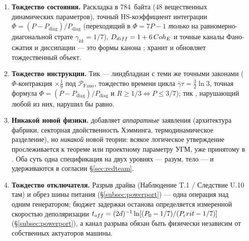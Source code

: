 \begin{enumerate}[leftmargin=1.6em,itemsep=1pt]
  \item \textbf{Тождество состояния.} Раскладка \DM{} в $784$~байта ($48$
        вещественных динамических параметров), точный HS-коэффициент интеграции
        $\Phi=(P-P_{\mathrm{diag}})/P_{\mathrm{diag}}$ (переходящий в
        $\Phi=7P-1$ \emph{только} на равномерно-диагональной страте
        $\gamma_{kk}=1/7$), $D_{diff}=1+6\,Coh_E$ и точные каналы
        Фано-сжатия и диссипации --- это формы канона \SYNARC{}; \TALOS{} хранит
        и обновляет тождественный объект.
  \item \textbf{Тождество инструкции.} Тик --- линдбладиан \SYNARC{} с теми же
        точными законами ($\Phi$-контракция $\times\tfrac19$ под
        $\mathcal{P}_{\mathrm{Fano}}$, тождество времени цикла
        $\bar\gamma\tau=\tfrac32\ln3$, точная формула
        $\Phi=(P-P_{\mathrm{diag}})/P_{\mathrm{diag}}$ и
        $R\ge 1/3\Leftrightarrow P\le 3/7$); тик \TALOS{}, нарушающий любой из
        них, нарушил бы \SYNARC{} равно.
  \item \textbf{Никакой новой физики.} \TALOS{} добавляет \emph{аппаратные}
        заявления (архитектура фабрики, секторная двойственность Хэмминга,
        термодинамическое разделение), но \emph{никакой} новой теории: всякое
        логическое утверждение прослеживается к теореме или проектному параметру
        УГМ, уже принятому в \SYNARC{}. Оба суть одна спецификация на двух
        уровнях --- \SYNARC{} разум, \TALOS{} тело --- и удерживаются в согласии
        \S\ref{sec:redteam}.
  \item \textbf{Тождество отключателя.} Разрыв драйва \SYNARC{}
        (Наблюдение T.1 / Следствие U.10 там) и обрез шины питания \TALOS{}
        (\S\ref{subsec:powerport}) --- одна операция над одним генератором;
        бюджет задержки останова определяется измеренной скоростью деполяризации
        $t_{off}=(2d)^{-1}\ln[(P_0-1/7)/(P_crit-1/7)]$
        (\S\ref{subsec:powerport}), а канал разрыва обязан быть физически
        независим от собственных актуаторов машины.
\end{enumerate}
